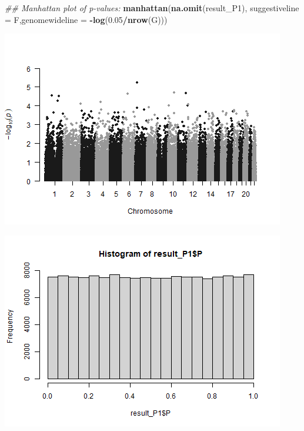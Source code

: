 \documentclass[
]{article}
\newenvironment{Shaded}{\begin{snugshade}}{\end{snugshade}}
\newcommand{\CommentTok}[1]{\textcolor[rgb]{0.56,0.35,0.01}{\textit{#1}}}
\newcommand{\DataTypeTok}[1]{\textcolor[rgb]{0.13,0.29,0.53}{#1}}
\newcommand{\DecValTok}[1]{\textcolor[rgb]{0.00,0.00,0.81}{#1}}
\newcommand{\FloatTok}[1]{\textcolor[rgb]{0.00,0.00,0.81}{#1}}
\newcommand{\KeywordTok}[1]{\textcolor[rgb]{0.13,0.29,0.53}{\textbf{#1}}}
\newcommand{\NormalTok}[1]{#1}
\newcommand{\OperatorTok}[1]{\textcolor[rgb]{0.81,0.36,0.00}{\textbf{#1}}}
\begin{document}
\begin{Shaded}
\begin{Highlighting}[]
\CommentTok{## Manhattan plot of p-values:}
\KeywordTok{manhattan}\NormalTok{(}\KeywordTok{na.omit}\NormalTok{(result_P1), }\DataTypeTok{suggestiveline =}\NormalTok{ F,}\DataTypeTok{genomewideline =} \OperatorTok{-}\KeywordTok{log}\NormalTok{(}\FloatTok{0.05}\OperatorTok{/}\KeywordTok{nrow}\NormalTok{(G)))}
\end{Highlighting}
\end{Shaded}

\includegraphics{stats-gene-research-progress-v9_files/figure-latex/unnamed-chunk-3-2.png}

\begin{Shaded}
\end{Shaded}

\includegraphics{stats-gene-research-progress-v9_files/figure-latex/unnamed-chunk-3-3.png}
\end{document}

